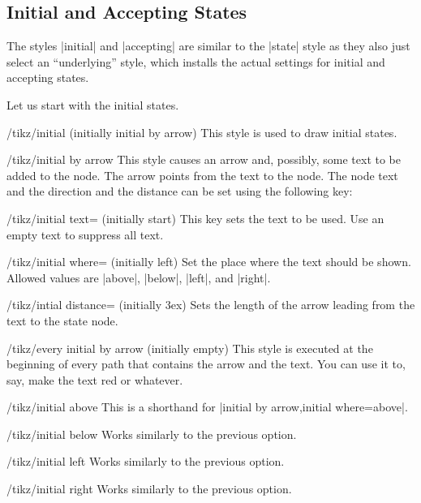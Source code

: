 \subsection{Initial and Accepting States}

The styles |initial| and |accepting| are similar to the |state| style
as they also just select an ``underlying'' style, which installs the
actual settings for initial and accepting states.

Let us start with the initial states.
\begin{stylekey}{/tikz/initial (initially initial by arrow)}
  This style is used to draw initial states.
\end{stylekey}
\begin{stylekey}{/tikz/initial by arrow}
  This style causes an arrow and, possibly, some text to be added to
  the node. The arrow points from the text to the node. The node text
  and the direction and the distance can be set using the following
  key:
  \begin{key}{/tikz/initial text= (initially start)}
    This key sets the text to be used. Use an empty text to suppress
    all text.
  \end{key}
  \begin{key}{/tikz/initial where= (initially left)}
    Set the place where the text should be shown. Allowed values are
    |above|, |below|, |left|, and |right|.
  \end{key}
  \begin{key}{/tikz/intial distance= (initially 3ex)}
    Sets the length of the arrow leading from the text to the state
    node.
  \end{key}
  \begin{stylekey}{/tikz/every initial by arrow (initially \normalfont empty)}
    This style is executed at the beginning of every path that contains
    the arrow and the text. You can use it to, say, make the text red or
    whatever.
  \end{stylekey}
\begin{codeexample}[]
\end{codeexample}
\end{stylekey}
\begin{stylekey}{/tikz/initial above}
  This is a shorthand for |initial by arrow,initial where=above|.
\end{stylekey}
\begin{stylekey}{/tikz/initial below}
  Works similarly to the previous option.
\end{stylekey}
\begin{stylekey}{/tikz/initial left}
  Works similarly to the previous option.
\end{stylekey}
\begin{stylekey}{/tikz/initial right}
  Works similarly to the previous option.
\end{stylekey}

